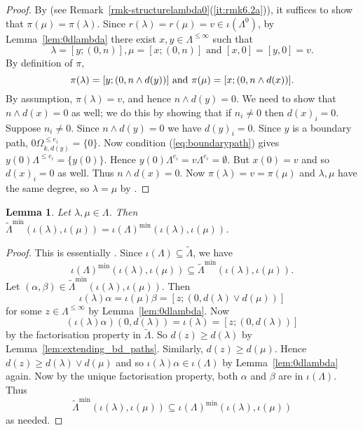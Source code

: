 \documentclass[a4paper,12pt]{amsart}
\numberwithin{equation}{section}
\newtheorem{lemma}[thm]{Lemma}
\theoremstyle{definition}
\theoremstyle{remark}
\begin{document}
\begin{proof} By \cite[Lemma~4.19]{W} (see Remark~\ref{rmk-structurelambda0}(\ref{it:rmk6.2a})),
it suffices to show that $\pi(\mu) = \pi(\lambda)$.  
Since $r(\lambda) = r(\mu) = v \in \iota(\Lambda^0)$, 
by Lemma~\ref{lem:0dlambda} 
there exist $x,y \in \Lambda^{\leq \infty}$ such that
\[
 \lambda = [y;(0,n)],
\mu = [x;(0,n)] \text{ and }
[x,0]=[y,0] = v.\]
By definition of $\pi$,
\[ \pi(\lambda) = [y; (0, n \wedge d(y))] \text{ and }\\
\pi(\mu) = [x;(0, n \wedge d(x))].
\]
By assumption, $\pi(\lambda) = v$, and hence $n \wedge d(y) = 0$.
We need to show that $n \wedge d(x) = 0$ as well; we do this by showing that if $n_i\neq 0$ then $d(x)_i=0$.
Suppose $n_i\neq 0$. Since $n \wedge d(y) = 0$ we have $d(y)_i=0$. 
Since $y$ is a boundary path,
$0 \Omega_{k,d(y)}^{\leq e_i} = \{0\}$.  
Now condition (\ref{eq:boundarypath}) gives  
$y(0)\Lambda^{\leq e_i} = \{y(0)\}$.   Hence $y(0)\Lambda^{e_i}=v\Lambda^{e_i}=\emptyset$.  But $x(0)=v$ and so $d(x)_i=0$ as well. Thus $n\wedge d(x)=0$.
Now $\pi(\lambda)=v=\pi(\mu)$ and $\lambda,\mu$ have the same degree, so $\lambda=\mu$ by  \cite[Lemma~4.19]{W}.
\end{proof}

\begin{lemma}\label{lem-minextensions}
Let $\lambda,\mu\in\Lambda$. Then $\tilde\Lambda^{\min}(\iota(\lambda),\iota(\mu))=\iota(\Lambda)^{\min}(\iota(\lambda),\iota(\mu))$.
\end{lemma}

\begin{proof}
 This is essentially \cite[Lemma~4.22]{W}.  Since
$\iota(\Lambda) \subseteq {\tilde{\Lambda}}$, we have \[\iota(\Lambda)^{\min}(\iota(\lambda),\iota(\mu))
 \subseteq \tilde\Lambda^{\min}(\iota(\lambda),\iota(\mu)).\]  Let $(\alpha, \beta) \in \tilde\Lambda^{\min}(\iota(\lambda),\iota(\mu))$.
Then
\[\iota(\lambda)\alpha = \iota(\mu)\beta = [z;(0,d(\lambda) \vee d(\mu))]\]
for some $z \in \Lambda^{\leq \infty}$ by Lemma~\ref{lem:0dlambda}.  
Now\[
    (\iota(\lambda)\alpha)(0,d(\lambda)) = \iota(\lambda) = [z;(0,d(\lambda))]
   \]
by the factorisation property in ${\tilde{\Lambda}}$.  So $d(z) \geq d(\lambda)$
by Lemma~\ref{lem:extending_bd_paths}.  Similarly, $d(z) \geq d(\mu)$.
Hence $d(z) \geq d(\lambda) \vee d(\mu)$ and so $\iota(\lambda)\alpha \in \iota(\Lambda)$
by Lemma~\ref{lem:0dlambda} again.
Now by the unique factorisation property, both $\alpha$ and $\beta$ are in $\iota(\Lambda)$.
Thus \[\tilde\Lambda^{\min}(\iota(\lambda),\iota(\mu)) \subseteq \iota(\Lambda)^{\min}(\iota(\lambda),\iota(\mu))\]
as needed.
\end{proof}
\end{document}
